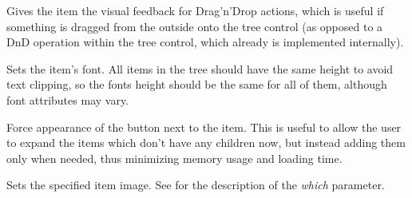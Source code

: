 %

\label{wxtreectrlsetitemdrophighlight}


Gives the item the visual feedback for Drag'n'Drop actions, which is
useful if something is dragged from the outside onto the tree control
(as opposed to a DnD operation within the tree control, which already
is implemented internally).

\label{wxtreectrlsetitemfont}


Sets the item's font. All items in the tree should have the same height to avoid
text clipping, so the fonts height should be the same for all of them,
although font attributes may vary.




\label{wxtreectrlsetitemhaschildren}


Force appearance of the button next to the item. This is useful to
allow the user to expand the items which don't have any children now,
but instead adding them only when needed, thus minimizing memory
usage and loading time.


\label{wxtreectrlsetitemimage}


Sets the specified item image. See 
for the description of the {\it which} parameter.


\label{wxtreectrlsetitemselectedimage}


